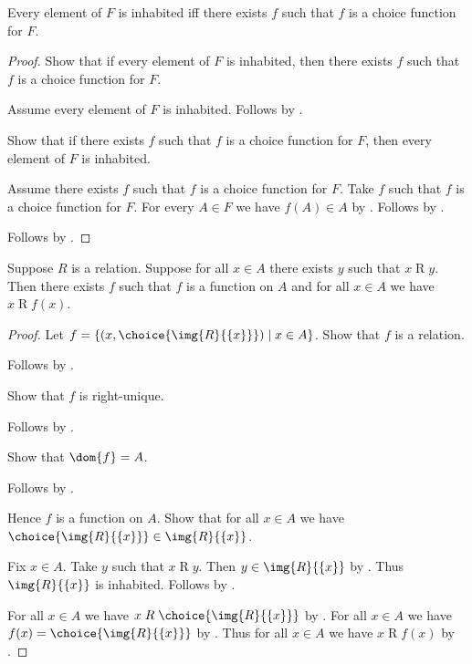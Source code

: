 \begin{theorem}\label{choice_function_exists_iff}
    Every element of $F$ is inhabited iff
        there exists $f$ such that $f$ is a choice function for $F$.
\end{theorem}
\begin{proof}
    Show that if every element of $F$ is inhabited, then there exists $f$
        such that $f$ is a choice function for $F$.
    \begin{subproof}
        Assume every element of $F$ is inhabited.
        Follows by .
    \end{subproof}
    Show that if there exists $f$ such that $f$ is a choice function for
        $F$, then every element of $F$ is inhabited.
    \begin{subproof}
        Assume there exists $f$ such that $f$ is a choice function for $F$.
        Take $f$ such that $f$ is a choice function for $F$.
        For every $A\in F$ we have $f(A)\in A$ by
            .
        Follows by \auto.
    \end{subproof}
    Follows by \auto.
\end{proof}


\begin{theorem}\label{axiom_of_choice}
    Suppose $R$ is a relation.
    Suppose for all $x\in A$ there exists $y$ such that $x\mathrel{R} y$.
    Then there exists $f$ such that $f$ is a function on $A$ and
        for all $x\in A$ we have $x\mathrel{R} f(x)$.
\end{theorem}
\begin{proof}
    Let $f=\{(x,\choice{\img{R}{\{x\}}})\mid x\in A\}$.
    Show that $f$ is a relation.
    \begin{subproof}
        Follows by .
    \end{subproof}
    Show that $f$ is right-unique.
    \begin{subproof}
        Follows by .
    \end{subproof}
    Show that $\dom{f}=A$.
    \begin{subproof}
        Follows by .
    \end{subproof}
    Hence $f$ is a function on $A$.
    Show that for all $x\in A$ we have
        $\choice{\img{R}{\{x\}}}\in\img{R}{\{x\}}$.
    \begin{subproof}
        Fix $x\in A$.
        Take $y$ such that $x\mathrel{R}y$.
        Then $y\in\img{R}{\{x\}}$ by .
        Thus $\img{R}{\{x\}}$ is inhabited.
        Follows by .
    \end{subproof}
    For all $x\in A$ we have
        $x\mathrel{R}\choice{\img{R}{\{x\}}}$
        by .
    For all $x\in A$ we have
        $f(x)=\choice{\img{R}{\{x\}}}$
        by .
    Thus for all $x\in A$ we have $x\mathrel{R}f(x)$ by \auto.
\end{proof}
